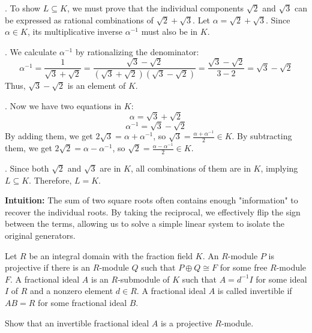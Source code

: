 \begin{solution}
. To show $L \subseteq K$, we must prove that the individual components $\sqrt{2}$ and $\sqrt{3}$ can be expressed as rational combinations of $\sqrt{2} + \sqrt{3}$. Let $\alpha = \sqrt{2} + \sqrt{3}$. Since $\alpha \in K$, its multiplicative inverse $\alpha^{-1}$ must also be in $K$.

. We calculate $\alpha^{-1}$ by rationalizing the denominator:
$$\alpha^{-1} = \frac{1}{\sqrt{3} + \sqrt{2}} = \frac{\sqrt{3} - \sqrt{2}}{(\sqrt{3} + \sqrt{2})(\sqrt{3} - \sqrt{2})} = \frac{\sqrt{3} - \sqrt{2}}{3 - 2} = \sqrt{3} - \sqrt{2}$$
Thus, $\sqrt{3} - \sqrt{2}$ is an element of $K$.

. Now we have two equations in $K$:
$$\alpha = \sqrt{3} + \sqrt{2}$$
$$\alpha^{-1} = \sqrt{3} - \sqrt{2}$$
By adding them, we get $2\sqrt{3} = \alpha + \alpha^{-1}$, so $\sqrt{3} = \frac{\alpha + \alpha^{-1}}{2} \in K$.
By subtracting them, we get $2\sqrt{2} = \alpha - \alpha^{-1}$, so $\sqrt{2} = \frac{\alpha - \alpha^{-1}}{2} \in K$.

. Since both $\sqrt{2}$ and $\sqrt{3}$ are in $K$, all combinations of them are in $K$, implying $L \subseteq K$. Therefore, $L = K$.

\medskip
\textbf{Intuition:}
The sum of two square roots often contains enough "information" to recover the individual roots. By taking the reciprocal, we effectively flip the sign between the terms, allowing us to solve a simple linear system to isolate the original generators.
\end{solution}

\begin{exercise}
\label{algebra:2022:2}
Let $R$ be an integral domain with the fraction field $K$. An $R$-module $P$ is projective if there is an $R$-module $Q$ such that $P \oplus Q \cong F$ for some free $R$-module $F$. A fractional ideal $A$ is an $R$-submodule of $K$ such that $A = d^{-1}I$ for some ideal $I$ of $R$ and a nonzero element $d \in R$. A fractional ideal $A$ is called invertible if $AB = R$ for some fractional ideal $B$.

Show that an invertible fractional ideal $A$ is a projective $R$-module.
\end{exercise}

